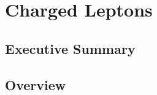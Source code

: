 %

\chapter{Charged Leptons}
\label{chap:charged-leptons}


\begin{center}\begin{boldmath}






\end{boldmath}\end{center}

\makeatletter
\renewcommand{\paragraph}{\@startsection{paragraph}{4}{0ex}%
   {-3.25ex plus -1ex minus -0.2ex}%
   {1.5ex plus 0.2ex}%
   {\normalfont\normalsize\bfseries}}
\makeatother



\tableofcontents

\section{Executive Summary}\label{sec:cl:execsum}


\section{Overview}\label{sec:cl:over}


